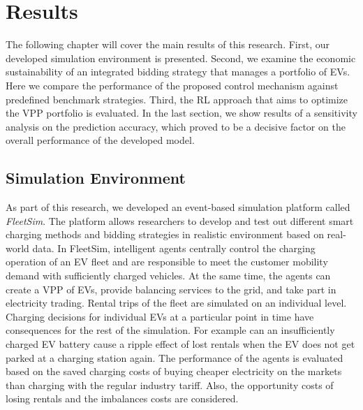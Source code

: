 \documentclass[a4paper, 12pt]{article}
\begin{document}
\clearpage

\section{Results}
\label{sec:orgea25f01}
The following chapter will cover the main results of this research. First, our
developed simulation environment is presented. Second, we examine the economic
sustainability of an integrated bidding strategy that manages a portfolio of
EVs. Here we compare the performance of the proposed control mechanism against
predefined benchmark strategies. Third, the RL approach that aims to optimize
the VPP portfolio is evaluated. In the last section, we show results of a
sensitivity analysis on the prediction accuracy, which proved to be a decisive
factor on the overall performance of the developed model.

\subsection{Simulation Environment}
\label{sec:orged28596}
As part of this research, we developed an event-based simulation platform called
\emph{FleetSim}. The platform allows researchers to develop and test out different
smart charging methods and bidding strategies in realistic environment based on
real-world data. In FleetSim, intelligent agents centrally control the charging
operation of an EV fleet and are responsible to meet the customer mobility
demand with sufficiently charged vehicles. At the same time, the agents can
create a VPP of EVs, provide balancing services to the grid, and take part in
electricity trading. Rental trips of the fleet are simulated on an individual
level. Charging decisions for individual EVs at a particular point in time have
consequences for the rest of the simulation. For example can an insufficiently
charged EV battery cause a ripple effect of lost rentals when the EV does not
get parked at a charging station again. The performance of the agents is
evaluated based on the saved charging costs of buying cheaper electricity on the
markets than charging with the regular industry tariff. Also, the opportunity
costs of losing rentals and the imbalances costs are considered.
\end{document}
